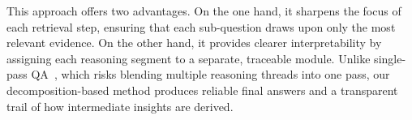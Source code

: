 \documentclass[runningheads]{llncs}
\begin{document}
This approach offers two advantages. On the one hand, it sharpens the focus of each retrieval step, ensuring that each sub-question draws upon only the most relevant evidence. On the other hand, it provides clearer interpretability by assigning each reasoning segment to a separate, traceable module. Unlike single-pass QA~\cite{kojima2022large,wei2022chain}, which risks blending multiple reasoning threads into one pass, our decomposition-based method produces reliable final answers and a transparent trail of how intermediate insights are derived.

\end{document}

